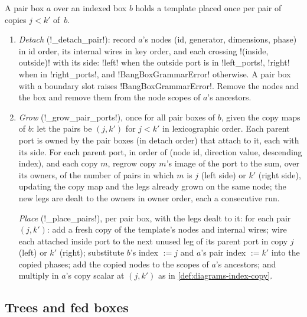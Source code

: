 \begin{algorithm}\label{alg:diagrams-pairs}
A pair box $a$ over an indexed box $b$ holds a template placed once per pair of copies $j<k'$ of~$b$.
\begin{enumerate}
\item \emph{Detach} (\py!_detach_pair!): record $a$'s nodes (id, generator, dimensions, phase) in id order, its internal wires in key order, and each crossing \py!(inside, outside)! with its side: \code!left! when the outside port is in \py!left_ports!, \code!right! when in \py!right_ports!, and \py!BangBoxGrammarError! otherwise. A pair box with a boundary slot raises \py!BangBoxGrammarError!. Remove the nodes and the box and remove them from the node scopes of $a$'s ancestors.
\item \emph{Grow} (\py!_grow_pair_ports!), once for all pair boxes of $b$, given the copy maps of $b$: let the pairs be $(j,k')$ for $j<k'$ in lexicographic order. Each parent port is owned by the pair boxes (in detach order) that attach to it, each with its side. For each parent port, in order of (node id, direction value, descending index), and each copy $m$, regrow copy $m$'s image of the port to the sum, over its owners, of the number of pairs in which $m$ is $j$ (left side) or $k'$ (right side), updating the copy map and the legs already grown on the same node; the new legs are dealt to the owners in owner order, each a consecutive run.\par\emph{Place} (\py!_place_pairs!), per pair box, with the legs dealt to it: for each pair $(j,k')$: add a fresh copy of the template's nodes and internal wires; wire each attached inside port to the next unused leg of its parent port in copy $j$ (left) or $k'$ (right); substitute $b$'s index $:=j$ and $a$'s pair index $:=k'$ into the copied phases; add the copied nodes to the scopes of $a$'s ancestors; and multiply in $a$'s copy scalar at $(j,k')$ as in \cref{def:diagrams-index-copy}.
\end{enumerate}
\end{algorithm}

\subsection{Trees and fed boxes}

